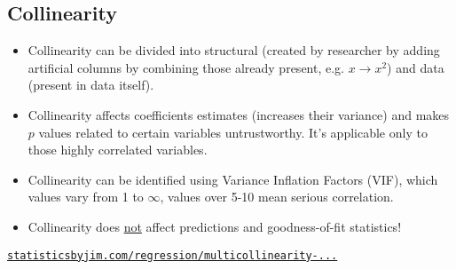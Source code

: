 \documentclass{article}
\begin{document}
\subsection{Collinearity}
\begin{itemize}
\item Collinearity can be divided into structural (created by researcher by adding artificial columns by combining those already present, e.g. $x \rightarrow x^2$) and data (present in data itself).
\item Collinearity affects coefficients estimates (increases their variance) and makes $p$ values related to certain variables untrustworthy. It's applicable only to those highly correlated variables.
\item Collinearity can be identified using Variance Inflation Factors (VIF), which values vary from 1 to $\infty$, values over 5-10 mean serious correlation.
\item Collinearity does \underline{not} affect predictions and goodness-of-fit statistics! 
\end{itemize}

\href{http://statisticsbyjim.com/regression/multicollinearity-in-regression-analysis/}{\texttt{statisticsbyjim.com/regression/multicollinearity-...}}
\end{document}
